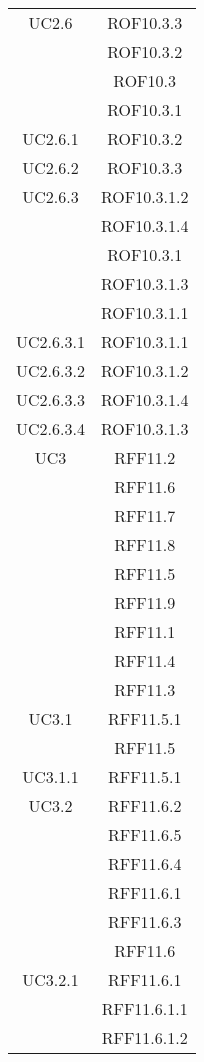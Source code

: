 \begin{longtable}{|c|c|}
\midrule
UC2.6
& ROF10.3.3\\
& ROF10.3.2\\
& ROF10.3\\
& ROF10.3.1\\

\midrule
UC2.6.1
& ROF10.3.2\\

\midrule
UC2.6.2
& ROF10.3.3\\

\midrule
UC2.6.3
& ROF10.3.1.2\\
& ROF10.3.1.4\\
& ROF10.3.1\\
& ROF10.3.1.3\\
& ROF10.3.1.1\\

\midrule
UC2.6.3.1
& ROF10.3.1.1\\

\midrule
UC2.6.3.2
& ROF10.3.1.2\\

\midrule
UC2.6.3.3
& ROF10.3.1.4\\

\midrule
UC2.6.3.4
& ROF10.3.1.3\\

\midrule
UC3
& RFF11.2\\
& RFF11.6\\
& RFF11.7\\
& RFF11.8\\
& RFF11.5\\
& RFF11.9\\
& RFF11.1\\
& RFF11.4\\
& RFF11.3\\

\midrule
UC3.1
& RFF11.5.1\\
& RFF11.5\\

\midrule
UC3.1.1
& RFF11.5.1\\

\midrule
UC3.2
& RFF11.6.2\\
& RFF11.6.5\\
& RFF11.6.4\\
& RFF11.6.1\\
& RFF11.6.3\\
& RFF11.6\\

\midrule
UC3.2.1
& RFF11.6.1\\
& RFF11.6.1.1\\
& RFF11.6.1.2\\


\end{longtable}
